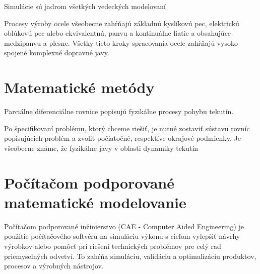\documentclass[]{tukediphc}
\begin{document}

Simulácie sú jadrom všetkých vedeckých modelovaní

Procesy výroby ocele všeobecne zahŕňajú základnú kyslíkovú pec, elektrickú oblúkovú pec alebo ekvivalentnú, panvu a kontinuálne liatie a obsahujúce medzipanvu a plesne. Všetky tieto kroky spracovania ocele zahŕňajú vysoko spojené komplexné dopravné javy.


\section{Matematické metódy}

Parciálne diferenciálne rovnice popisujú fyzikálne procesy pohybu tekutín.

Po špecifikovaní problému, ktorý chceme riešiť, je nutné zostaviť sústavu rovníc popisujúcich problém a zvoliť počiatočné, respektíve okrajové podmienky. Je všeobecne známe, že fyzikálne javy v oblasti dynamiky tekutín


\section{Počítačom podporované matematické modelovanie}

Počítačom podporované inžinierstvo (CAE - Computer Aided Engineering) je použitie počítačového softvéru na simuláciu výkonu s cieľom vylepšiť návrhy výrobkov alebo pomôcť pri riešení technických problémov pre celý rad priemyselných odvetví. To zahŕňa simuláciu, validáciu a optimalizáciu produktov, procesov a výrobných nástrojov.
\end{document}
